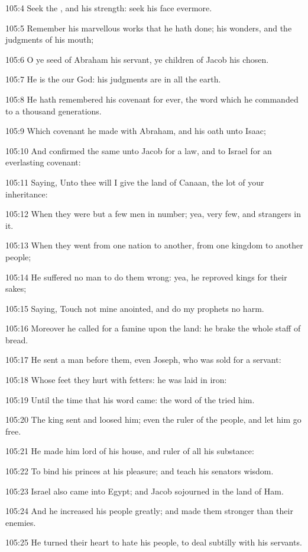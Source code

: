 105:4 Seek the \LORD, and his strength: seek his face evermore.

105:5 Remember his marvellous works that he hath done; his wonders,
and the judgments of his mouth;

105:6 O ye seed of Abraham his servant, ye children of Jacob his
chosen.

105:7 He is the \LORD our God: his judgments are in all the earth.

105:8 He hath remembered his covenant for ever, the word which he
commanded to a thousand generations.

105:9 Which covenant he made with Abraham, and his oath unto Isaac;

105:10 And confirmed the same unto Jacob for a law, and to Israel for
an everlasting covenant:

105:11 Saying, Unto thee will I give the land of Canaan, the lot of
your inheritance:

105:12 When they were but a few men in number; yea, very few, and
strangers in it.

105:13 When they went from one nation to another, from one kingdom to
another people;

105:14 He suffered no man to do them wrong: yea, he reproved kings for
their sakes;

105:15 Saying, Touch not mine anointed, and do my prophets no harm.

105:16 Moreover he called for a famine upon the land: he brake the
whole staff of bread.

105:17 He sent a man before them, even Joseph, who was sold for a
servant:

105:18 Whose feet they hurt with fetters: he was laid in iron:

105:19 Until the time that his word came: the word of the \LORD tried
him.

105:20 The king sent and loosed him; even the ruler of the people, and
let him go free.

105:21 He made him lord of his house, and ruler of all his substance:

105:22 To bind his princes at his pleasure; and teach his senators
wisdom.

105:23 Israel also came into Egypt; and Jacob sojourned in the land of
Ham.

105:24 And he increased his people greatly; and made them stronger
than their enemies.

105:25 He turned their heart to hate his people, to deal subtilly with
his servants.

